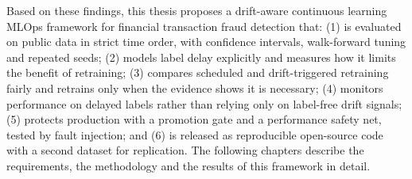 Based on these findings, this thesis proposes a drift-aware continuous learning MLOps framework for financial transaction fraud detection that: (1) is evaluated on public data in strict time order, with confidence intervals, walk-forward tuning and repeated seeds; (2) models label delay explicitly and measures how it limits the benefit of retraining; (3) compares scheduled and drift-triggered retraining fairly and retrains only when the evidence shows it is necessary; (4) monitors performance on delayed labels rather than relying only on label-free drift signals; (5) protects production with a promotion gate and a performance safety net, tested by fault injection; and (6) is released as reproducible open-source code with a second dataset for replication. The following chapters describe the requirements, the methodology and the results of this framework in detail.
